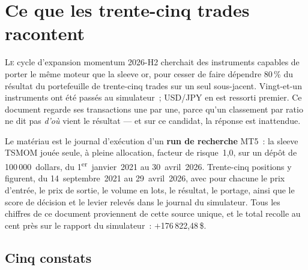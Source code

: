\section{Ce que les trente-cinq trades racontent}

\lettrine{L}{e} cycle d'expansion momentum 2026-H2 cherchait des instruments
capables de porter le même moteur que la sleeve or, pour cesser de faire
dépendre 80\,\% du résultat du portefeuille de trente-cinq trades sur un seul
sous-jacent. Vingt-et-un instruments ont été passés au simulateur~; USD/JPY en
est ressorti premier. Ce document regarde ses transactions une par une, parce
qu'un classement par ratio ne dit pas \emph{d'où} vient le résultat --- et sur
ce candidat, la réponse est inattendue.

Le matériau est le journal d'exécution d'un \textbf{run de recherche} MT5~: la
sleeve TSMOM jouée seule, à pleine allocation, facteur de risque~1,0, sur un
dépôt de 100\,000~dollars, du 1\textsuperscript{er}~janvier~2021 au
30~avril~2026. Trente-cinq positions y figurent, du 14~septembre~2021 au
29~avril~2026, avec pour chacune le prix d'entrée, le prix de sortie, le volume
en lots, le résultat, le portage, ainsi que le score de décision et le levier
relevés dans le journal du simulateur. Tous les chiffres de ce document
proviennent de cette source unique, et le total recolle au cent près sur le
rapport du simulateur~: $+$176\,822,48\,\$.

\subsection*{Cinq constats}

